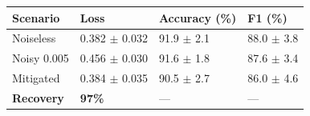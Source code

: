 \begin{tabular}{llll}
\toprule
Scenario & Loss & Accuracy (\%) & F1 (\%) \\
\midrule
Noiseless & 0.382 $\pm$ 0.032 & 91.9 $\pm$ 2.1 & 88.0 $\pm$ 3.8 \\
Noisy 0.005 & 0.456 $\pm$ 0.030 & 91.6 $\pm$ 1.8 & 87.6 $\pm$ 3.4 \\
Mitigated & 0.384 $\pm$ 0.035 & 90.5 $\pm$ 2.7 & 86.0 $\pm$ 4.6 \\
\textbf{Recovery} & \textbf{97\%} & --- & --- \\
\bottomrule
\end{tabular}
